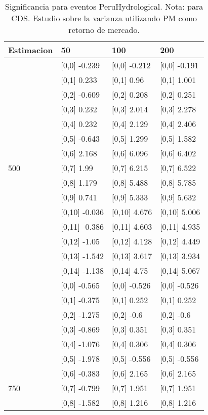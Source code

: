 \begin{table}

\caption{Significancia para eventos PeruHydrological. Nota: para CDS. Estudio sobre la varianza utilizando PM como retorno de mercado.}
\centering
\begin{tabular}[t]{llll}
\toprule
Estimacion & 50 & 100 & 200\\
\midrule
 & {}[0,0] -0.239 & {}[0,0] -0.212 & {}[0,0] -0.191\\
 & {}[0,1] 0.233 & {}[0,1] 0.96 & {}[0,1] 1.001\\
 & {}[0,2] -0.609 & {}[0,2] 0.208 & {}[0,2] 0.251\\
 & {}[0,3] 0.232 & {}[0,3] 2.014 & {}[0,3] 2.278\\
 & {}[0,4] 0.232 & {}[0,4] 2.129 & {}[0,4] 2.406\\
\addlinespace
 & {}[0,5] -0.643 & {}[0,5] 1.299 & {}[0,5] 1.582\\
 & {}[0,6] 2.168 & {}[0,6] 6.096 & {}[0,6] 6.402\\
500 & {}[0,7] 1.99 & {}[0,7] 6.215 & {}[0,7] 6.522\\
 & {}[0,8] 1.179 & {}[0,8] 5.488 & {}[0,8] 5.785\\
 & {}[0,9] 0.741 & {}[0,9] 5.333 & {}[0,9] 5.632\\
\addlinespace
 & {}[0,10] -0.036 & {}[0,10] 4.676 & {}[0,10] 5.006\\
 & {}[0,11] -0.386 & {}[0,11] 4.603 & {}[0,11] 4.935\\
 & {}[0,12] -1.05 & {}[0,12] 4.128 & {}[0,12] 4.449\\
 & {}[0,13] -1.542 & {}[0,13] 3.617 & {}[0,13] 3.934\\
 & {}[0,14] -1.138 & {}[0,14] 4.75 & {}[0,14] 5.067\\
\addlinespace
 & {}[0,0] -0.565 & {}[0,0] -0.526 & {}[0,0] -0.526\\
 & {}[0,1] -0.375 & {}[0,1] 0.252 & {}[0,1] 0.252\\
 & {}[0,2] -1.275 & {}[0,2] -0.6 & {}[0,2] -0.6\\
 & {}[0,3] -0.869 & {}[0,3] 0.351 & {}[0,3] 0.351\\
 & {}[0,4] -1.076 & {}[0,4] 0.306 & {}[0,4] 0.306\\
\addlinespace
 & {}[0,5] -1.978 & {}[0,5] -0.556 & {}[0,5] -0.556\\
 & {}[0,6] -0.383 & {}[0,6] 2.165 & {}[0,6] 2.165\\
750 & {}[0,7] -0.799 & {}[0,7] 1.951 & {}[0,7] 1.951\\
 & {}[0,8] -1.582 & {}[0,8] 1.216 & {}[0,8] 1.216\\

\end{tabular}
\end{table}
